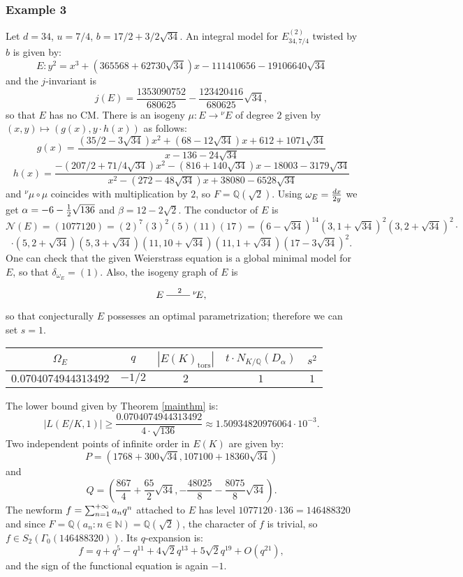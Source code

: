\documentclass[11pt]{amsart}
\theoremstyle{definition}
\begin{document}
		\subsubsection*{Example 3}
		Let $d=34$, $u=7/4$, $b=17/2+3/2\sqrt{34}$. An integral model for $E_{34,7/4}^{(2)}$ twisted by $b$ is given by:
		$$E\colon y^2 = x^3 + (365568+62730\sqrt{34})x -111410656-19106640\sqrt{34}$$
		and the $j$-invariant is
		$$j(E)=\frac{1353090752}{680625}-\frac{123420416}{680625}\sqrt{34},$$
		so that $E$ has no CM.
		There is an isogeny $\mu\colon E\to {{}^\nu\!} E$ of degree $2$ given by $(x,y)\mapsto (g(x),y\cdot h(x))$ as follows:
		$$g(x)=\frac{(35/2-3\sqrt{34})x^2 + (68-12\sqrt{34})x + 612+ 1071\sqrt{34}}{x - 136-24\sqrt{34}}$$
		$$h(x)=\frac{-(207/2+71/4\sqrt{34})x^2 - (816+140\sqrt{34})x - 18003-3179\sqrt{34} }{x^2 - (272-48\sqrt{34})x + 38080-6528\sqrt{34} }$$
		and ${{}^\nu\!}\mu\circ\mu$ coincides with multiplication by $2$, so $F={\mathbb{Q}}(\sqrt{2})$. Using ${\displaystyle} \omega_{E}=\frac{dx}{2y}$ we get ${\displaystyle} \alpha=-6-\frac{1}{2}\sqrt{136}$ and $\beta=12-2\sqrt{2}$. The conductor of $E$ is
		$$\mathcal N(E)=(1077120)=(2)^7(3)^2(5)(11)(17)=(6-\sqrt{34})^{14}(3,1+ \sqrt{34})^2(3,2+ \sqrt{34})^2\cdot $$
		$$\cdot (5,2+ \sqrt{34})(5,3+ \sqrt{34})(11, 10+\sqrt{34})(11, 1+\sqrt{34})(17-3\sqrt{34})^2.$$
		One can check that the given Weierstrass equation is a global minimal model for $E$, so that $\delta_{\omega_{E}}=(1)$. Also, the isogeny graph of $E$ is
		$$\begin{xymatrix}{E\ar@{-}[r]^2 & {{}^\nu\!} E,}\end{xymatrix}$$
		so that conjecturally $E$ possesses an optimal parametrization; therefore we can set $s=1$.
			\begin{center}
				\begin{tabular}{| c | c | c | c | c |}
			    \hline
				$\Omega_E$ & $q$ & $|E(K)_{\text{tors}}|$ & $t\cdot N_{K/{\mathbb{Q}}}(D_{\alpha})$  & $s^2$ \\ \hline\hline
			    $0.0704074944313492$ & $-1/2$ & $2$ & $1$ &  $1$\\ \hline
			  \end{tabular}
		\end{center}
		The lower bound given by Theorem \ref{mainthm} is:
		$$|L(E/K,1)|\geq\frac{0.0704074944313492}{4\cdot \sqrt{136}}\approx 1.50934820976064\cdot 10^{-3}.$$
		Two independent points of infinite order in $E(K)$ are given by:
		$$P=(1768+300 \sqrt{34} , 107100+18360 \sqrt{34})$$
		and
		$$Q=\left(\frac{867}{4} +\frac{65}{2} \sqrt{34} , - \frac{48025}{8}-\frac{8075}{8} \sqrt{34}\right).$$
		The newform ${\displaystyle} f=\sum_{n=1}^{+\infty}a_nq^n$ attached to $E$ has level $1077120\cdot 136=146488320$ and since $F={\mathbb{Q}}(a_n\colon n\in {\mathbb{N}})={\mathbb{Q}}(\sqrt{2})$, the character of $f$ is trivial, so $f\in S_2(\Gamma_0(146488320))$. Its $q$-expansion is:
		$$f=q+q^5-q^{11}+4\sqrt{2}q^{13}+5\sqrt{2}q^{19}+O(q^{21}),$$
		and the sign of the functional equation is again $-1$. 
\end{document}
